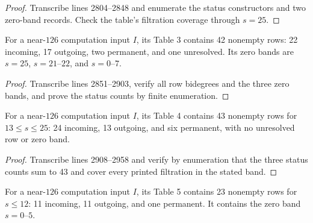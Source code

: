 \begin{proof}
  Transcribe lines 2804--2848 and enumerate the status constructors and two
  zero-band records.  Check the table's filtration coverage through $s=25$.
\end{proof}

\begin{proposition}
  \label{data:table-s123}
  \notready
  For a near-$126$ computation input $I$, its Table 3 contains 42 nonempty
  rows: 22 incoming, 17 outgoing, two permanent, and one unresolved.  Its zero
  bands are $s=25$, $s=21$--$22$, and $s=0$--$7$.
\end{proposition}

\begin{proof}
  Transcribe lines 2851--2903, verify all row bidegrees and the three zero
  bands, and prove the status counts by finite enumeration.
\end{proof}

\begin{proposition}
  \label{data:table-s124-high}
  \notready
  For a near-$126$ computation input $I$, its Table 4 contains 43 nonempty rows
  for $13\le s\le25$: 24 incoming, 13 outgoing, and six permanent, with no
  unresolved row or zero band.
\end{proposition}

\begin{proof}
  Transcribe lines 2908--2958 and verify by enumeration that the three status
  counts sum to 43 and cover every printed filtration in the stated band.
\end{proof}

\begin{proposition}
  \label{data:table-s124-low}
  \notready
  For a near-$126$ computation input $I$, its Table 5 contains 23 nonempty rows
  for $s\le12$: 11 incoming, 11 outgoing, and one permanent.  It contains the
  zero band $s=0$--$5$.
\end{proposition}

